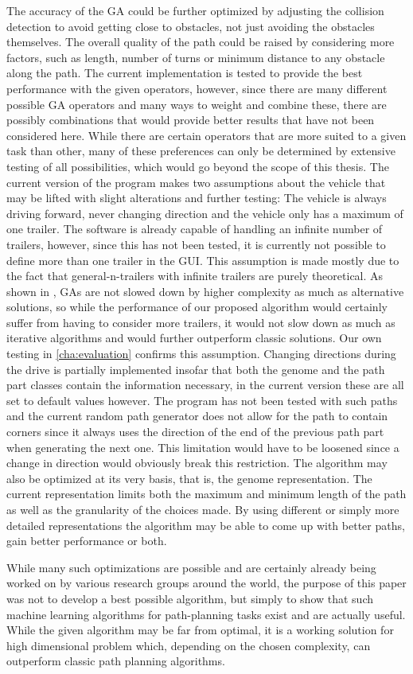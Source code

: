 The accuracy of the GA could be further optimized by adjusting the collision detection to avoid getting close to obstacles, not just avoiding the obstacles themselves. The overall quality of the path could be raised by considering more factors, such as length, number of turns or minimum distance to any obstacle along the path.
The current implementation is tested to provide the best performance with the given operators, however, since there are many different possible GA operators and many ways to weight and combine these, there are possibly combinations that would provide better results that have not been considered here. While there are certain operators that are more suited to a given task than other, many of these preferences can only be determined by extensive testing of all possibilities, which would go beyond the scope of this thesis.
The current version of the program makes two assumptions about the vehicle that may be lifted with slight alterations and further testing: The vehicle is always driving forward, never changing direction and the vehicle only has a maximum of one trailer. The software is already capable of handling an infinite number of trailers, however, since this has not been tested, it is currently not possible to define more than one trailer in the GUI. This assumption is made mostly due to the fact that general-n-trailers with infinite trailers are purely theoretical. As shown in \cite{8}, GAs are not slowed down by higher complexity as much as alternative solutions, so while the performance of our proposed algorithm would certainly suffer from having to consider more trailers, it would not slow down as much as iterative algorithms and would further outperform classic solutions. Our own testing in \ref{cha:evaluation} confirms this assumption.
Changing directions during the drive is partially implemented insofar that both the genome and the path part classes contain the information necessary, in the current version these are all set to default values however. The program has not been tested with such paths and the current random path generator does not allow for the path to contain corners since it always uses the direction of the end of the previous path part when generating the next one. This limitation would have to be loosened since a change in direction would obviously break this restriction.
The algorithm may also be optimized at its very basis, that is, the genome representation. The current representation limits both the maximum and minimum length of the path as well as the granularity of the choices made. By using different or simply more detailed representations the algorithm may be able to come up with better paths, gain better performance or both.

While many such optimizations are possible and are certainly already being worked on by various research groups around the world, the purpose of this paper was not to develop a best possible algorithm, but simply to show that such machine learning algorithms for path-planning tasks exist and are actually useful. While the given algorithm may be far from optimal, it is a working solution for high dimensional problem which, depending on the chosen complexity, can outperform classic path planning algorithms.